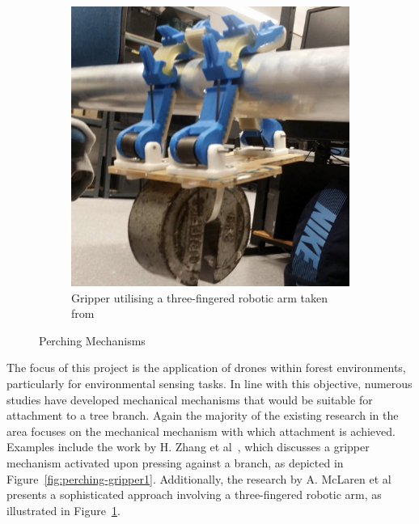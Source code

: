 \begin{figure}[ht]
\begin{subfigure}[b]{0.45\textwidth}
      \includegraphics[width=\textwidth]{background/perching-gripper2.png}
      \caption{Gripper utilising a three-fingered robotic arm taken from~\cite{perching-gripper2}}
      \label{fig:perching-gripper2}
  \end{subfigure}
  \caption{Perching Mechanisms}
  \label{fig:perching-grippers}
\end{figure}

The focus of this project is the application of drones within forest environments, particularly for environmental sensing tasks. 
In line with this objective, numerous studies have developed mechanical mechanisms that would be suitable for attachment to a tree branch. 
Again the majority of the existing research in the area focuses on the mechanical mechanism with which attachment is achieved. 
Examples include the work by H. Zhang et al~\cite{perching-gripper1}, which discusses a gripper mechanism activated upon pressing against a branch, as depicted in Figure~\ref{fig:perching-gripper1}. 
Additionally, the research by A. McLaren et al~\cite{perching-gripper2} presents a sophisticated approach involving a three-fingered robotic arm, as illustrated in Figure~\ref{fig:perching-gripper2}.


